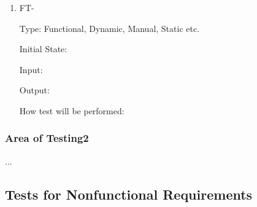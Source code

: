 \documentclass[12pt, titlepage]{article}
\newcounter{ftnum} %
\begin{document}
\begin{enumerate}
%
%
%					
%					
%					
%					
%
%
%					
%					
%					
%					
%
%
%					
%					
%					
%					
					
\item{FT-\theftnum \label{ft-}}

Type: Functional, Dynamic, Manual, Static etc. %
					
Initial State: 
					
Input: 
					
Output: 
					
How test will be performed: 

\end{enumerate}

\subsubsection{Area of Testing2}

...

\subsection{Tests for Nonfunctional Requirements}
\end{document}

